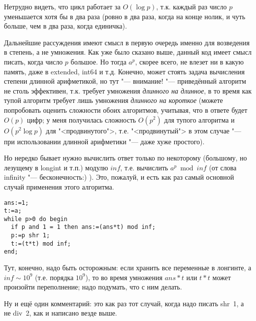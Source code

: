 Нетрудно видеть, что цикл работает за $O(\log p)$, т.к. каждый раз число $p$ уменьшается хотя бы 
в два раза (ровно в два раза, когда на конце нолик, и чуть больше, чем в два раза, когда единичка).

Дальнейшие рассуждения имеют смысл в первую очередь именно для возведения в степень, а не умножения. 
Как уже было сказано выше, данный код имеет смысл писать, когда число $p$ большое. Но тогда $a^p$, 
скорее всего, не влезет ни в какую память, даже в extended, int64 и т.д. Конечно, может стоять 
задача вычисления степени длинной арифметикой, но тут "--- внимание! "--- приведённый алгоритм 
не столь эффективен, т.к. требует умножения \textit{длинного на длинное}, в то время как тупой 
алгоритм требует лишь умножения \textit{длинного на короткое} (можете попробовать оценить сложности 
обоих алгоритмов, учитывая, что в ответе будет $O(p)$ цифр; у меня получилась сложность $O(p^2)$ 
для тупого алгоритма и $O(p^2\log p)$ для "<продвинутого">, т.е. "<продвинутый"> в этом случае "--- 
при использовании длинной арифметики "--- даже хуже простого).

Но нередко бывает нужно вычислить ответ только по некоторому (большому, но лезущему в longint и т.п.) модулю $inf$, т.е. 
вычислить $a^p \bmod inf$ (от слова infinity "--- бесконечность:) ).  Это, пожалуй, и есть как раз 
самый основной случай применения этого алгоритма.

\begin{codesampleo}\begin{verbatim}
ans:=1;
t:=a;
while p>0 do begin
  if p and 1 = 1 then ans:=(ans*t) mod inf;
  p:=p shr 1;
  t:=(t*t) mod inf;
end;
\end{verbatim}\end{codesampleo}

Тут, конечно, надо быть осторожным: если хранить все переменные в лонгинте, а $inf\sim 10^9$ (т.е. 
порядка $10^9$), то во время умножения $ans*t$ или $t*t$ может произойти переполнение; надо 
подумать, что с ним делать.

Ну и ещё один комментарий: это как раз тот случай, когда надо писать shr~1, а не div~2, как и 
написано везде выше.
